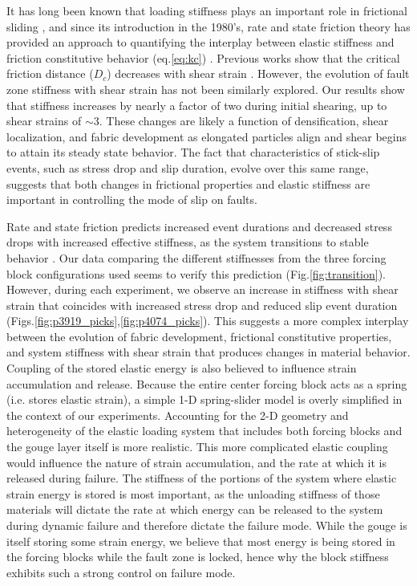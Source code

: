 It has long been known that loading stiffness plays an important role in
frictional sliding \cite{Jaeger_1971,Brace_1966}, and since its introduction in
the 1980's, rate and state friction theory has provided an approach to
quantifying the interplay between elastic stiffness and friction constitutive
behavior (eq.\ref{eq:kc}) \cite{rice1983constitutive}.  Previous works show that
the critical friction distance ($D_c$) decreases with shear strain
\cite{Marone_1993}.  However, the evolution of fault zone stiffness with shear
strain has not been similarly explored.  Our results show that stiffness
increases by nearly a factor of two during initial shearing, up to shear strains
of $\sim$3.  These changes are likely a function of densification, shear
localization, and fabric development as elongated particles align and shear
begins to attain its steady state behavior.  The fact that characteristics of
stick-slip events, such as stress drop and slip duration, evolve over this same
range, suggests that both changes in frictional properties and elastic stiffness
are important in controlling the mode of slip on faults.

Rate and state friction predicts increased event durations and decreased stress
drops with increased effective stiffness, as the system transitions to stable
behavior \cite{Baumberger_1999}. Our data comparing the different stiffnesses
from the three forcing block configurations used seems to verify this prediction
(Fig.\ref{fig:transition}).  However, during each experiment, we observe an
increase in stiffness with shear strain that coincides with increased stress
drop and reduced slip event duration
(Figs.\ref{fig:p3919_picks},\ref{fig:p4074_picks}).  This suggests a more
complex interplay between the evolution of fabric development, frictional
constitutive properties, and system stiffness with shear strain that produces
changes in material behavior.  Coupling of the stored elastic energy is also
believed to influence strain accumulation and release.  Because the entire
center forcing block acts as a spring (i.e. stores elastic strain), a simple 1-D
spring-slider model is overly simplified in the context of our experiments.
Accounting for the 2-D geometry and heterogeneity of the elastic loading system
that includes both forcing blocks and the gouge layer itself is more realistic.
This more complicated elastic coupling would influence the nature of strain
accumulation, and the rate at which it is released during failure. The stiffness
of the portions of the system where elastic strain energy is stored is most
important, as the unloading stiffness of those materials will dictate the rate
at which energy can be released to the system during dynamic failure and
therefore dictate the failure mode. While the gouge is itself storing some
strain energy, we believe that most energy is being stored in the forcing blocks
while the fault zone is locked, hence why the block stiffness exhibits such a strong
control on failure mode.

